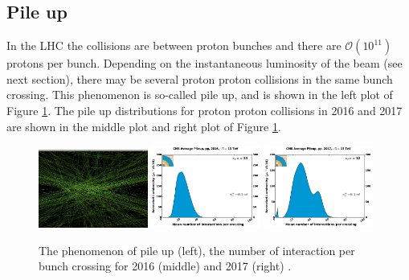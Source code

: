 \subsection{Pile up}\label{sec:LHC_pileup}
In the LHC the collisions are between proton bunches and there are $\mathcal{O}(10^{11})$ protons per bunch. Depending on the instantaneous luminosity of the beam (see next section), there may be several proton proton collisions in the same bunch crossing. This phenomenon is so-called pile up, and is shown in the left plot of Figure \ref{fig:LHC_pileup}. The pile up distributions for proton proton collisions in 2016 and 2017 are shown in the middle plot and right plot of Figure \ref{fig:LHC_pileup}.
\begin{figure}[h!]
\begin{center}
\includegraphics[width=0.32\textwidth]{figures/LHC/pile-up.png}
\includegraphics[width=0.32\textwidth]{figures/LHC/pileup_pp_2016_69200.pdf}
\includegraphics[width=0.32\textwidth]{figures/LHC/pileup_pp_2017_69200.pdf}
\caption{The phenomenon of pile up (left), the number of interaction per bunch crossing for 2016 (middle) and 2017 (right) \cite{CMS_Luminosity}.}
\label{fig:LHC_pileup}
\end{center}
\end{figure}

